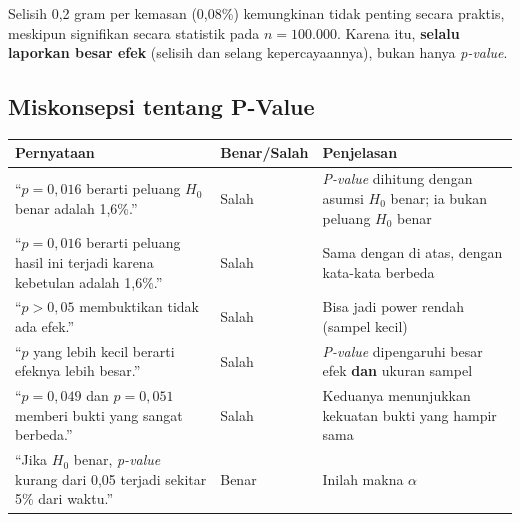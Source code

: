 \documentclass[
  indonesian,
  letterpaper,
]{book}
\newcounter{none} %
\begin{document}
Selisih 0,2 gram per kemasan (0,08\%) kemungkinan tidak penting secara
praktis, meskipun signifikan secara statistik pada \(n = 100.000\).
Karena itu, \textbf{selalu laporkan besar efek} (selisih dan selang
kepercayaannya), bukan hanya \emph{p-value}.

\subsection{Miskonsepsi tentang
P-Value}\label{miskonsepsi-tentang-p-value}

{\def\LTcaptype{none} %
\begin{longtable}[]{@{}
  >{\raggedright\arraybackslash}p{}
  >{\centering\arraybackslash}p{}
  >{\raggedright\arraybackslash}p{}@{}}
\toprule\noalign{}
\begin{minipage}[b]{\linewidth}\raggedright
Pernyataan
\end{minipage} & \begin{minipage}[b]{\linewidth}\centering
Benar/Salah
\end{minipage} & \begin{minipage}[b]{\linewidth}\raggedright
Penjelasan
\end{minipage} \\
\midrule\noalign{}
\endhead
\bottomrule\noalign{}
\endlastfoot
``\(p = 0{,}016\) berarti peluang \(H_0\) benar adalah 1,6\%.'' & Salah
& \emph{P-value} dihitung dengan asumsi \(H_0\) benar; ia bukan peluang
\(H_0\) benar \\
``\(p = 0{,}016\) berarti peluang hasil ini terjadi karena kebetulan
adalah 1,6\%.'' & Salah & Sama dengan di atas, dengan kata-kata
berbeda \\
``\(p > 0{,}05\) membuktikan tidak ada efek.'' & Salah & Bisa jadi power
rendah (sampel kecil) \\
``\(p\) yang lebih kecil berarti efeknya lebih besar.'' & Salah &
\emph{P-value} dipengaruhi besar efek \textbf{dan} ukuran sampel \\
``\(p = 0{,}049\) dan \(p = 0{,}051\) memberi bukti yang sangat
berbeda.'' & Salah & Keduanya menunjukkan kekuatan bukti yang hampir
sama \\
``Jika \(H_0\) benar, \emph{p-value} kurang dari 0,05 terjadi sekitar
5\% dari waktu.'' & Benar & Inilah makna \(\alpha\) \\
\end{longtable}
}
\end{document}
